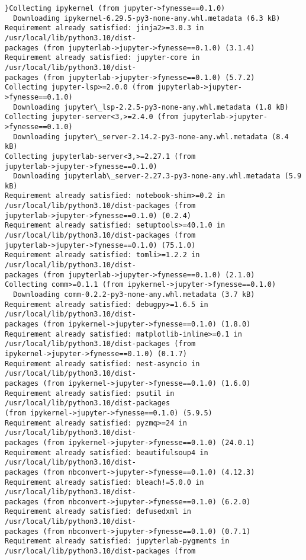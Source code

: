 \documentclass[11pt]{article}
\begin{document}
\begin{Verbatim}[commandchars=\\\{\}]
}Collecting ipykernel (from jupyter->fynesse==0.1.0)
  Downloading ipykernel-6.29.5-py3-none-any.whl.metadata (6.3 kB)
Requirement already satisfied: jinja2>=3.0.3 in /usr/local/lib/python3.10/dist-
packages (from jupyterlab->jupyter->fynesse==0.1.0) (3.1.4)
Requirement already satisfied: jupyter-core in /usr/local/lib/python3.10/dist-
packages (from jupyterlab->jupyter->fynesse==0.1.0) (5.7.2)
Collecting jupyter-lsp>=2.0.0 (from jupyterlab->jupyter->fynesse==0.1.0)
  Downloading jupyter\_lsp-2.2.5-py3-none-any.whl.metadata (1.8 kB)
Collecting jupyter-server<3,>=2.4.0 (from jupyterlab->jupyter->fynesse==0.1.0)
  Downloading jupyter\_server-2.14.2-py3-none-any.whl.metadata (8.4 kB)
Collecting jupyterlab-server<3,>=2.27.1 (from
jupyterlab->jupyter->fynesse==0.1.0)
  Downloading jupyterlab\_server-2.27.3-py3-none-any.whl.metadata (5.9 kB)
Requirement already satisfied: notebook-shim>=0.2 in
/usr/local/lib/python3.10/dist-packages (from
jupyterlab->jupyter->fynesse==0.1.0) (0.2.4)
Requirement already satisfied: setuptools>=40.1.0 in
/usr/local/lib/python3.10/dist-packages (from
jupyterlab->jupyter->fynesse==0.1.0) (75.1.0)
Requirement already satisfied: tomli>=1.2.2 in /usr/local/lib/python3.10/dist-
packages (from jupyterlab->jupyter->fynesse==0.1.0) (2.1.0)
Collecting comm>=0.1.1 (from ipykernel->jupyter->fynesse==0.1.0)
  Downloading comm-0.2.2-py3-none-any.whl.metadata (3.7 kB)
Requirement already satisfied: debugpy>=1.6.5 in /usr/local/lib/python3.10/dist-
packages (from ipykernel->jupyter->fynesse==0.1.0) (1.8.0)
Requirement already satisfied: matplotlib-inline>=0.1 in
/usr/local/lib/python3.10/dist-packages (from
ipykernel->jupyter->fynesse==0.1.0) (0.1.7)
Requirement already satisfied: nest-asyncio in /usr/local/lib/python3.10/dist-
packages (from ipykernel->jupyter->fynesse==0.1.0) (1.6.0)
Requirement already satisfied: psutil in /usr/local/lib/python3.10/dist-packages
(from ipykernel->jupyter->fynesse==0.1.0) (5.9.5)
Requirement already satisfied: pyzmq>=24 in /usr/local/lib/python3.10/dist-
packages (from ipykernel->jupyter->fynesse==0.1.0) (24.0.1)
Requirement already satisfied: beautifulsoup4 in /usr/local/lib/python3.10/dist-
packages (from nbconvert->jupyter->fynesse==0.1.0) (4.12.3)
Requirement already satisfied: bleach!=5.0.0 in /usr/local/lib/python3.10/dist-
packages (from nbconvert->jupyter->fynesse==0.1.0) (6.2.0)
Requirement already satisfied: defusedxml in /usr/local/lib/python3.10/dist-
packages (from nbconvert->jupyter->fynesse==0.1.0) (0.7.1)
Requirement already satisfied: jupyterlab-pygments in
/usr/local/lib/python3.10/dist-packages (from

\end{Verbatim}
\end{document}
